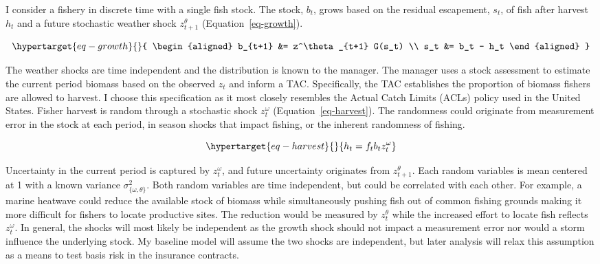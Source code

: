 \documentclass[
  letterpaper,
  DIV=11,
  numbers=noendperiod]{scrartcl}
\begin{document}
I consider a fishery in discrete time with a single fish stock. The
stock, \(b_t\), grows based on the residual escapement, \(s_t\), of fish
after harvest \(h_t\) and a future stochastic weather shock
\(z^\theta_{t+1}\) (Equation~\ref{eq-growth}).

\begin{equation}\protect\hypertarget{eq-growth}{}{
\begin{aligned}
b_{t+1} &= z^\theta_{t+1} G(s_t) \\
s_t &= b_t - h_t
\end{aligned}
}\label{eq-growth}\end{equation}

The weather shocks are time independent and the distribution is known to
the manager. The manager uses a stock assessment to estimate the current
period biomass based on the observed \(z_t\) and inform a TAC.
Specifically, the TAC establishes the proportion of biomass fishers are
allowed to harvest. I choose this specification as it most closely
resembles the Actual Catch Limits (ACLs) policy used in the United
States. Fisher harvest is random through a stochastic shock
\(z^\omega_t\) (Equation~\ref{eq-harvest}). The randomness could
originate from measurement error in the stock at each period, in season
shocks that impact fishing, or the inherent randomness of fishing.

\begin{equation}\protect\hypertarget{eq-harvest}{}{
h_t=f_tb_tz^\omega_t
}\label{eq-harvest}\end{equation}

Uncertainty in the current period is captured by \(z_t^\omega\), and
future uncertainty originates from \(z_{t+1}^\theta\). Each random
variables is mean centered at 1 with a known variance
\(\sigma^2_{\{\omega,\theta\}}\). Both random variables are time
independent, but could be correlated with each other. For example, a
marine heatwave could reduce the available stock of biomass while
simultaneously pushing fish out of common fishing grounds making it more
difficult for fishers to locate productive sites. The reduction would be
measured by \(z_t^\theta\) while the increased effort to locate fish
reflects \(z_t^\omega\). In general, the shocks will most likely be
independent as the growth shock should not impact a measurement error
nor would a storm influence the underlying stock. My baseline model will
assume the two shocks are independent, but later analysis will relax
this assumption as a means to test basis risk in the insurance
contracts.
\end{document}

